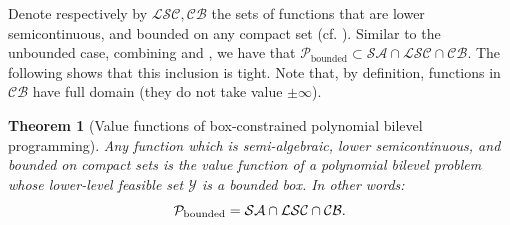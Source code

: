 \documentclass{article}
\newcommand*{\cP}{\mathcal{P}}
\newcommand*{\cY}{\mathcal{Y}}
\newcommand{\SA}{\mathcal{SA}}
\newcommand{\LSC}{\mathcal{LSC}}
\newcommand{\BC}{\mathcal{CB}}
\newcommand{\bounded}{\text{bounded}}
\newcommand{\optim}{\text{optim}}
\newcommand{\pessim}{\text{pessim}}
\theoremstyle{plain}
\newtheorem{theorem}{Theorem}[section]
\theoremstyle{definition}
\begin{document}
Denote respectively by $\LSC, \BC$ the sets of functions that are lower semicontinuous, and bounded on any compact set (cf. ). Similar to the unbounded case, combining  and , we have that $\cP_{\bounded} \subset \SA\cap \LSC \cap \BC$. The following shows that this inclusion is tight. Note that, by definition, functions in $\BC$ have full domain (they do not take value $\pm \infty$). 



\begin{theorem}[Value functions of  box-constrained polynomial bilevel programming]
    \label{theorem:compact=lsc+bc}
    Any function which is semi-algebraic, lower semicontinuous, and bounded on compact sets is the value function of a polynomial bilevel problem whose lower-level feasible set $\cY$ is a bounded box. In other words:
    \begin{equation*}
        \cP_{\textup{\bounded}} = \SA \cap \LSC \cap \BC.
    \end{equation*}
\end{theorem}
\end{document}
